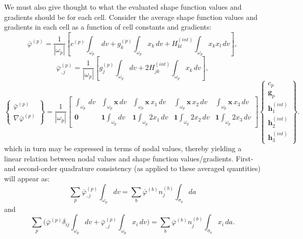 \documentclass[11pt]{article} %
\begin{document}
We must also give thought to what the evaluated shape function values and gradients should be for each cell. Consider the average shape function values and gradients in each cell as a function of cell constants and gradients:
\begin{equation}
	\bar{\varphi}^{(p)} = \frac{1}{| \omega_p |} \left[ c^{(p)} \int_{\omega_p} \, dv + g^{(p)}_k \int_{\omega_p} x_k \, dv + H^{(int)}_{kl} \int_{\omega_p} x_k x_l \, dv \right] ,
\end{equation}
\begin{equation}
	\bar{\varphi}^{(p)}_{,j} = \frac{1}{| \omega_p |} \left[ g^{(p)}_j \int_{\omega_p} dv + 2 H^{(int)}_{jk} \int_{\omega_p} x_k \, dv \right] ,
\end{equation}
\begin{equation}
	\left\{ \begin{array}{c} \bar{\varphi}^{(p)} \\ \nabla \bar{\varphi}^{(p)} \end{array} \right\} = \frac{1}{| \omega_p |} \left[ \begin{array}{ccccc} \int_{\omega_p} \, dv & \int_{\omega_p} \mathbf{x} \, dv & \int_{\omega_p} \mathbf{x} \, x_1 \, dv & \int_{\omega_p} \mathbf{x} \, x_2 \, dv & \int_{\omega_p} \mathbf{x} \, x_3 \, dv \\ \mathbf{0} & \mathbf{1} \int_{\omega_p} dv & \mathbf{1} \int_{\omega_p} 2 x_1 \, dv & \mathbf{1} \int_{\omega_p} 2 x_2 \, dv & \mathbf{1} \int_{\omega_p} 2 x_3 \, dv \end{array} \right] \left\{ \begin{array}{c} c_p \\ \mathbf{g}_p \\ \mathbf{h}^{(int)}_{1} \\ \mathbf{h}^{(int)}_{2} \\ \mathbf{h}^{(int)}_{3} \end{array} \right\} .
\end{equation}
which in turn may be expressed in terms of nodal values, thereby yielding a linear relation between nodal values and shape function values/gradients. First- and second-order quadrature consistency (as applied to these averaged quantities) will appear as:
\begin{equation}
	\sum_p \bar{\varphi}^{(p)}_{,j} \int_{\omega_p} dv = \sum_{b} \bar{\varphi}^{(b)} n^{(b)}_j \int_{\sigma_b} da
\end{equation}
and
\begin{equation}
	\sum_p \bigg( \bar{\varphi}^{(p)} \delta_{ij} \int_{\omega_p} dv + \bar{\varphi}^{(p)}_{,j} \int_{\omega_p} x_i \, dv \bigg) = \sum_{b} \bar{\varphi}^{(b)} n^{(b)}_j \int_{\sigma_b} x_i \, da .
\end{equation}
\end{document}
